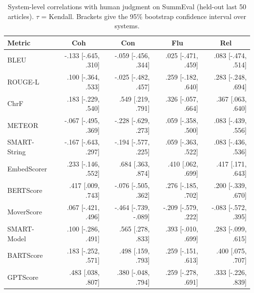 \begin{table}[t]
\centering
\caption{System-level correlations with human judgment on SummEval (held-out last 50 articles). $\tau$ = Kendall. Brackets give the 95\% bootstrap confidence interval over systems.}
\label{tab:correlations_system_kendall}
\small
\linespread{1}\selectfont
\setlength{\tabcolsep}{4pt}
\begin{tabular}{@{}lrrrr@{}}
\toprule
Metric & \multicolumn{1}{c}{Coh} & \multicolumn{1}{c}{Con} & \multicolumn{1}{c}{Flu} & \multicolumn{1}{c}{Rel} \\
\midrule
BLEU & -.133 {\scriptsize [-.645, .310]} & -.059 {\scriptsize [-.456, .344]} & .025 {\scriptsize [-.471, .459]} & .083 {\scriptsize [-.474, .514]} \\
ROUGE-L & .100 {\scriptsize [-.364, .533]} & -.025 {\scriptsize [-.482, .457]} & .259 {\scriptsize [-.182, .640]} & .283 {\scriptsize [-.248, .694]} \\
ChrF & .183 {\scriptsize [-.229, .540]} & .549 {\scriptsize [.219, .791]} & .326 {\scriptsize [-.057, .664]} & .367 {\scriptsize [.063, .640]} \\
METEOR & -.067 {\scriptsize [-.495, .369]} & -.228 {\scriptsize [-.629, .273]} & .059 {\scriptsize [-.358, .500]} & .083 {\scriptsize [-.439, .556]} \\
SMART-String & -.167 {\scriptsize [-.643, .297]} & -.194 {\scriptsize [-.577, .225]} & .059 {\scriptsize [-.363, .522]} & .083 {\scriptsize [-.436, .536]} \\
EmbedScorer & .233 {\scriptsize [-.146, .552]} & .684 {\scriptsize [.363, .874]} & .410 {\scriptsize [.062, .699]} & .417 {\scriptsize [.171, .643]} \\
BERTScore & .417 {\scriptsize [.009, .743]} & -.076 {\scriptsize [-.505, .362]} & .276 {\scriptsize [-.185, .702]} & .200 {\scriptsize [-.339, .670]} \\
MoverScore & .067 {\scriptsize [-.421, .496]} & -.464 {\scriptsize [-.739, -.089]} & -.209 {\scriptsize [-.579, .222]} & -.083 {\scriptsize [-.572, .395]} \\
SMART-Model & .100 {\scriptsize [-.286, .491]} & .565 {\scriptsize [.278, .833]} & .393 {\scriptsize [-.010, .699]} & .283 {\scriptsize [-.099, .615]} \\
BARTScore & .183 {\scriptsize [-.252, .571]} & .498 {\scriptsize [.159, .793]} & .259 {\scriptsize [-.151, .613]} & .400 {\scriptsize [.075, .707]} \\
GPTScore & .483 {\scriptsize [.038, .807]} & .380 {\scriptsize [-.048, .794]} & .259 {\scriptsize [-.278, .691]} & .333 {\scriptsize [-.226, .839]} \\

\end{tabular}
\end{table}
